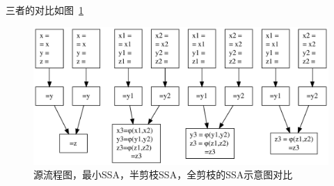 三者的对比如图~\ref{fig:why?}

\begin{figure}[htb]
  \centering
  \includegraphics[width=1.0\textwidth]{figures/mini_half_pured_SSA.pdf}
  \caption{源流程图，最小SSA，半剪枝SSA，全剪枝的SSA示意图对比}
  \label{fig:why?}
  
\end{figure}
